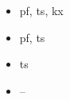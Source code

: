 \documentclass[a4paper]{article}
\begin{document}
\begin{itemize}
  \item pf, ts, kx
  \item pf, ts
  \item ts
  \item --
\end{itemize}







\end{document}
